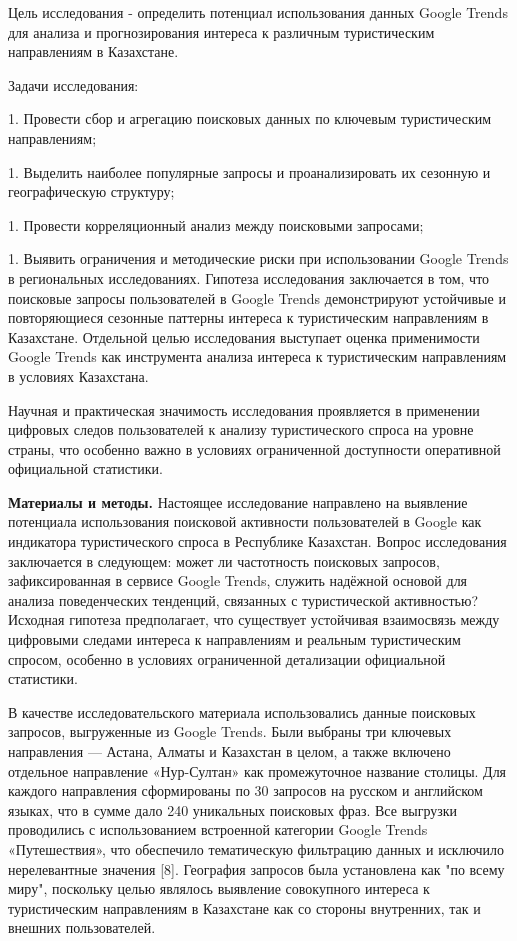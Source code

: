 Цель исследования - определить потенциал использования данных Google
Trends для анализа и прогнозирования интереса к различным туристическим
направлениям в Казахстане.

Задачи исследования:


1. Провести сбор и агрегацию поисковых данных по ключевым туристическим
направлениям;

1. Выделить наиболее популярные запросы и проанализировать их сезонную и
географическую структуру;

1. Провести корреляционный анализ между поисковыми запросами;

1. Выявить ограничения и методические риски при использовании Google
Trends в региональных исследованиях.
Гипотеза исследования заключается в том, что поисковые запросы
пользователей в Google Trends демонстрируют устойчивые и повторяющиеся
сезонные паттерны интереса к туристическим направлениям в Казахстане.
Отдельной целью исследования выступает оценка применимости Google Trends
как инструмента анализа интереса к туристическим направлениям в условиях
Казахстана.

Научная и практическая значимость исследования проявляется в применении
цифровых следов пользователей к анализу туристического спроса на уровне
страны, что особенно важно в условиях ограниченной доступности
оперативной официальной статистики.

{\bfseries Материалы и методы.} Настоящее исследование направлено на
выявление потенциала использования поисковой активности пользователей в
Google как индикатора туристического спроса в Республике Казахстан.
Вопрос исследования заключается в следующем: может ли частотность
поисковых запросов, зафиксированная в сервисе Google Trends, служить
надёжной основой для анализа поведенческих тенденций, связанных с
туристической активностью? Исходная гипотеза предполагает, что
существует устойчивая взаимосвязь между цифровыми следами интереса к
направлениям и реальным туристическим спросом, особенно в условиях
ограниченной детализации официальной статистики.

В качестве исследовательского материала использовались данные поисковых
запросов, выгруженные из Google Trends. Были выбраны три ключевых
направления --- Астана, Алматы и Казахстан в целом, а также включено
отдельное направление «Нур-Султан» как промежуточное название столицы.
Для каждого направления сформированы по 30 запросов на русском и
английском языках, что в сумме дало 240 уникальных поисковых фраз. Все
выгрузки проводились с использованием встроенной категории Google Trends
«Путешествия», что обеспечило тематическую фильтрацию данных и исключило
нерелевантные значения {[}8{]}. География запросов была установлена как
"по всему миру", поскольку целью являлось выявление совокупного интереса
к туристическим направлениям в Казахстане как со стороны внутренних, так
и внешних пользователей.

